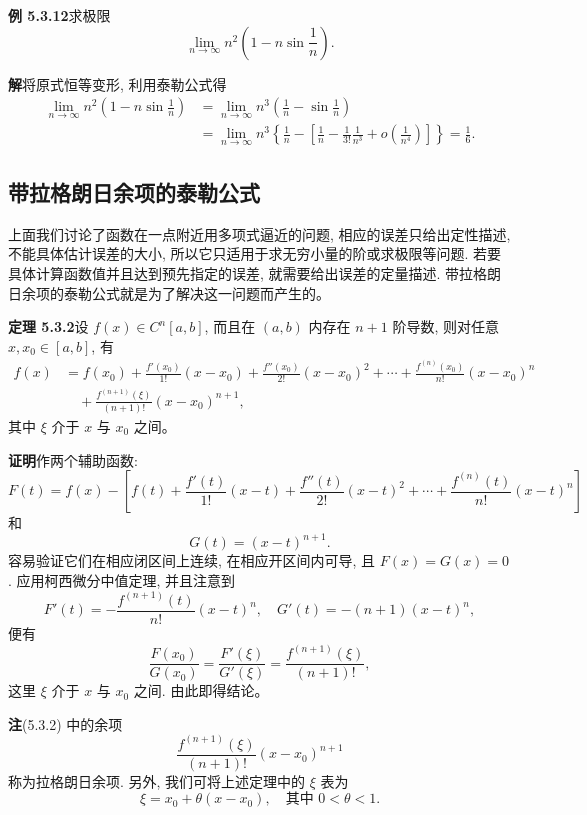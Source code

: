 \documentclass[UTF8,12pt,a4paper,fontset=fandol]{ctexart}
\begin{document}
\noindent\textbf{例 5.3.12}\quad 求极限
\[
  \lim_{n\to\infty}n^2\left(1-n\sin\frac1n\right).
\]

\noindent\textbf{解}\quad 将原式恒等变形, 利用泰勒公式得
\[
\begin{aligned}
  \lim_{n\to\infty}n^2\left(1-n\sin\frac1n\right)
  &=
  \lim_{n\to\infty}n^3\left(\frac1n-\sin\frac1n\right) \\
  &=
  \lim_{n\to\infty}n^3
  \left\{
    \frac1n-
    \left[\frac1n-\frac1{3!}\frac1{n^3}+o\left(\frac1{n^4}\right)\right]
  \right\}
  =
  \frac16.
\end{aligned}
\]

\subsection{带拉格朗日余项的泰勒公式}

上面我们讨论了函数在一点附近用多项式逼近的问题, 相应的误差只给出定性描述, 不能具体估计误差的大小, 所以它只适用于求无穷小量的阶或求极限等问题. 若要具体计算函数值并且达到预先指定的误差, 就需要给出误差的定量描述. 带拉格朗日余项的泰勒公式就是为了解决这一问题而产生的。

\noindent\textbf{定理 5.3.2}\quad 设 $f(x)\in C^n[a,b]$, 而且在 $(a,b)$ 内存在 $n+1$ 阶导数, 则对任意 $x,x_0\in[a,b]$, 有
\[
\begin{aligned}
  f(x)
  &=
  f(x_0)+\frac{f'(x_0)}{1!}(x-x_0)+\frac{f''(x_0)}{2!}(x-x_0)^2
  +\cdots+\frac{f^{(n)}(x_0)}{n!}(x-x_0)^n \\
  &\quad+
  \frac{f^{(n+1)}(\xi)}{(n+1)!}(x-x_0)^{n+1},
\end{aligned}
  \tag{5.3.2}
\]
其中 $\xi$ 介于 $x$ 与 $x_0$ 之间。

\noindent\textbf{证明}\quad 作两个辅助函数:
\[
  F(t)=f(x)-\left[
  f(t)+\frac{f'(t)}{1!}(x-t)+\frac{f''(t)}{2!}(x-t)^2
  +\cdots+\frac{f^{(n)}(t)}{n!}(x-t)^n
  \right]
\]
和
\[
  G(t)=(x-t)^{n+1}.
\]
容易验证它们在相应闭区间上连续, 在相应开区间内可导, 且 $F(x)=G(x)=0$. 应用柯西微分中值定理, 并且注意到
\[
  F'(t)=-\frac{f^{(n+1)}(t)}{n!}(x-t)^n,\quad
  G'(t)=-(n+1)(x-t)^n,
\]
便有
\[
  \frac{F(x_0)}{G(x_0)}
  =
  \frac{F'(\xi)}{G'(\xi)}
  =
  \frac{f^{(n+1)}(\xi)}{(n+1)!},
\]
这里 $\xi$ 介于 $x$ 与 $x_0$ 之间. 由此即得结论。

\noindent\textbf{注}\quad (5.3.2) 中的余项
\[
  \frac{f^{(n+1)}(\xi)}{(n+1)!}(x-x_0)^{n+1}
\]
称为拉格朗日余项. 另外, 我们可将上述定理中的 $\xi$ 表为
\[
  \xi=x_0+\theta(x-x_0),\quad \text{其中 }0<\theta<1.
\]
\end{document}
